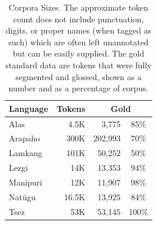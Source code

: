 \begin{table}[hb]
    \centering
    \begin{tabular}{l|r|rc}
         \textbf{Language} & \textbf{Tokens} & \multicolumn{2}{c}{\textbf{Gold}} \\
         \hline
         Alas & 4.5K & 3,775 & 85\%  \\
         \hline
         Arapaho & 300K & 202,993 & 70\% \\
         \hline
         Lamkang & 101K & 50,252 & 50\% \\
         \hline
         Lezgi & 14K & 13,353  &  94\% \\
         \hline
         Manipuri & 12K & 11,907 & 98\% \\
         \hline
         Natügu & 16.5K & 13,925 &  84\%  \\
         \hline
         Tsez & 53K & 53,145 & 100\%  \\
    \end{tabular}
    \caption[Corpora Sizes]{Corpora Sizes. The approximate token count does not include punctuation, digits, or proper names (when tagged as such) which are often left unannotated but can be easily supplied. The gold standard data are tokens that were fully segmented and glossed, shown as a number and as a percentage of corpus.}
    \label{tab:goldstandard}
\end{table}

